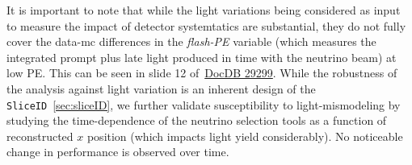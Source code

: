 \par It is important to note that while the light variations being considered as input to measure the impact of detector systemtatics are substantial, they do not fully cover the data-mc differences in the \textit{flash-PE} variable (which measures the integrated prompt plus late light produced in time with the neutrino beam) at low PE. This can be seen in slide 12 of~\href{https://microboone-docdb.fnal.gov/cgi-bin/private/ShowDocument?docid=29299}{DocDB 29299}. While the robustness of the analysis against light variation is an inherent design of the \texttt{SliceID}~\ref{sec:sliceID}, we further validate susceptibility to light-mismodeling by studying the time-dependence of the neutrino selection tools as a function of reconstructed $x$ position (which impacts light yield considerably). No noticeable change in performance is observed over time.

